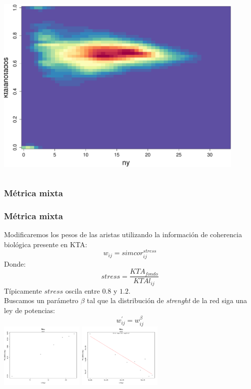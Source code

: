 \documentclass[serif,9pt, t]{beamer}
\begin{document}
\begin{frame}
\begin{columns}[T]
    \centering    
    \includegraphics[width=0.90\textwidth]{lktaanotados_vs_nyanotados.pdf}
\end{columns}
\end{frame}

\subsubsection*{Métrica mixta}
\begin{frame}\frametitle{Métrica mixta} 
Modificaremos los pesos de las aristas utilizando la información de coherencia biológica presente en KTA:
\begin{equation}
	w_{ij} = simcor_{ij}^{stress}
\end{equation}
Donde:
\begin{equation}
	stress = \frac{KTA_{fondo}}{KTAl_{ij}}
\end{equation}
Típicamente $stress$ oscila entre $0.8$ y $1.2$.\\
Buscamos un parámetro $\beta$ tal que la distribución de \textit{strenght} de la red siga una ley de potencias:
\begin{equation}
	w_{ij}^{'} = w_{ij}^{\beta}
\end{equation}
\centering
\includegraphics[width=0.3\textwidth]{distribucion_strength_beta_1.pdf}
\includegraphics[width=0.3\textwidth]{distribucion_strength_beta_4.pdf}
\end{frame}
\end{document}

